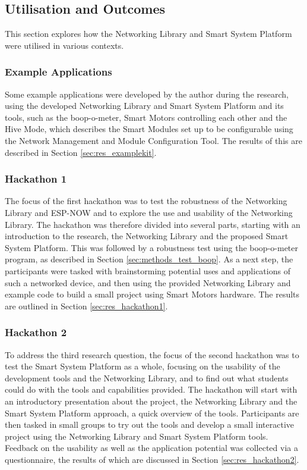 \subsection{\label{sec:methods_}Utilisation and Outcomes}
This section explores how the Networking Library and Smart System Platform were utilised in various contexts. 

\subsubsection{\label{sec:methods_example}Example Applications}
Some example applications were developed by the author during the research, using the developed Networking Library and Smart System Platform and its tools, such as the boop-o-meter, Smart Motors controlling each other and the Hive Mode, which describes the Smart Modules set up to be configurable using the Network Management and Module Configuration Tool. The results of this are described in Section \ref{sec:res_examplekit}.

\subsubsection{\label{sec:methods_hackathon1}Hackathon 1}
The focus of the first hackathon was to test the robustness of the Networking Library and ESP-NOW and to explore the use and usability of the Networking Library. The hackathon was therefore divided into several parts, starting with an introduction to the research, the Networking Library and the proposed Smart System Platform. This was followed by a robustness test using the boop-o-meter program, as described in Section \ref{sec:methods_test_boop}. As a next step, the participants were tasked with brainstorming potential uses and applications of such a networked device, and then using the provided Networking Library and example code to build a small project using Smart Motors hardware. The results are outlined in Section \ref{sec:res_hackathon1}.

\subsubsection{\label{sec:methods_hackathon2}Hackathon 2}
To address the third research question, the focus of the second hackathon was to test the Smart System Platform as a whole, focusing on the usability of the development tools and the Networking Library, and to find out what students could do with the tools and capabilities provided. The hackathon will start with an introductory presentation about the project, the Networking Library and the Smart System Platform approach, a quick overview of the tools. Participants are then tasked in small groups to try out the tools and develop a small interactive project using the Networking Library and Smart System Platform tools. Feedback on the usability as well as the application potential was collected via a questionnaire, the results of which are discussed in Section \ref{sec:res_hackathon2}.

